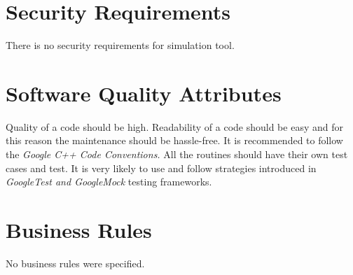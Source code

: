 \section{Security Requirements}
	\begin{comment}
		$<$Specify any requirements regarding security or privacy issues surrounding use 
		of the product or protection of the data used or created by the product. Define 
		any user identity authentication requirements. Refer to any external policies or 
		regulations containing security issues that affect the product. Define any 
		security or privacy certifications that must be satisfied.$>$
	\end{comment}
	There is no security requirements for simulation tool.
\section{Software Quality Attributes}
	\begin{comment}
		$<$Specify any additional quality characteristics for the product that will be 
		important to either the customers or the developers. Some to consider are: 
		adaptability, availability, correctness, flexibility, interoperability, 
		maintainability, portability, reliability, reusability, robustness, testability, 
		and usability. Write these to be specific, quantitative, and verifiable when 
		possible. At the least, clarify the relative preferences for various attributes, 
		such as ease of use over ease of learning.$>$
	\end{comment}
	{
		Quality of a code should be high. Readability of a code should be easy and for this reason the maintenance should be hassle-free. It is recommended to follow the \emph{Google C++ Code Conventions.}
	}
	{
		All the routines should have their own test cases and test. It is very likely to use and follow strategies introduced in \emph{GoogleTest and GoogleMock} testing frameworks.
	}
\section{Business Rules}
	\begin{comment}
		$<$List any operating principles about the product, such as which individuals or 
		roles can perform which functions under specific circumstances. These are not 
		functional requirements in themselves, but they may imply certain functional 
		requirements to enforce the rules.$>$
	\end{comment}
	No business rules were specified.